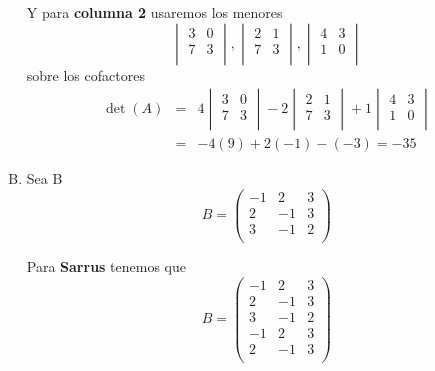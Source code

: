 \documentclass[12pt]{article}
\begin{document}
\begin{multicols}{2}
\begin{enumerate}[A.]
		Y para \textbf{columna 2} usaremos los menores
			$$\begin{vmatrix}
				 3 &  0 \\
				 7 &  3 \\
			\end{vmatrix},
			\begin{vmatrix}
				 2 &  1 \\
				 7 &  3 \\
			\end{vmatrix},
			\begin{vmatrix}
				 4 &  3 \\
				 1 &  0 \\
			\end{vmatrix}$$
		sobre los cofactores
			\begin{eqnarray*}
				\det(A) &=&
					4 \begin{vmatrix}
						 3 &  0 \\
						 7 &  3 \\
					\end{vmatrix} -
					2 \begin{vmatrix}
						 2 &  1 \\
						 7 &  3 \\
					\end{vmatrix} +
					1 \begin{vmatrix}
						 4 &  3 \\
						 1 &  0 \\
					\end{vmatrix} \\
					&=& - 4(9) + 2(-1) - (-3) = -35
			\end{eqnarray*}
		
		
		\item Sea B
			$$B = \begin{pmatrix}
				-1 &  2 &  3\\
				 2 & -1 &  3\\
				 3 & -1 &  2\\
			\end{pmatrix}$$
			
		Para \textbf{Sarrus} tenemos que 
			$$B = \begin{pmatrix}
				-1 &  2 &  3\\
				 2 & -1 &  3\\
				 3 & -1 &  2\\
				-1 &  2 &  3\\
				 2 & -1 &  3\\
			\end{pmatrix}$$
			

\end{enumerate}
\end{multicols}
\end{document}
